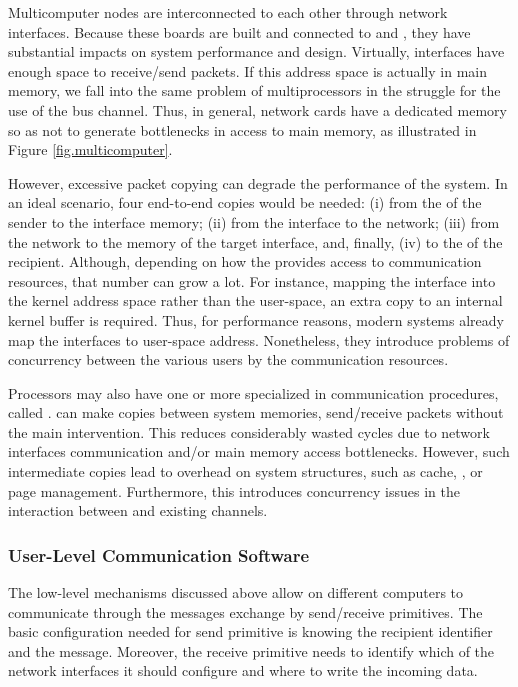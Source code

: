 				Multicomputer nodes are interconnected to each other through network interfaces.
				Because these boards are built and connected to \cpus and \ram,
				they have substantial impacts on system performance and \os design.
				Virtually, interfaces have enough \ram space to receive/send packets.
				If this address space is actually in main memory, we fall into the same
				problem of multiprocessors in the struggle for the use of the bus channel.
				Thus, in general, network cards have a dedicated memory so as not to
				generate bottlenecks in access to main memory, as illustrated in Figure \ref{fig.multicomputer}.

				However, excessive packet copying can degrade the performance of the system.
				In an ideal scenario, four end-to-end copies would be needed:
				(i) from the \ram of the sender to the interface memory; (ii) from the interface
				to the network; (iii) from the network to the memory of the target interface, and,
				finally, (iv) to the \ram of the recipient.
				Although, depending on how the \os provides access to communication
				resources, that number can grow a lot.
				For instance, mapping the interface into the kernel address space
				rather than the user-space, an extra copy to an internal kernel
				buffer is required.
				Thus, for performance reasons, modern systems already map the interfaces
				to user-space address.
				Nonetheless, they introduce problems of concurrency between the various
				users by the communication resources.

				Processors may also have one or more \cpus specialized in
				communication procedures, called \dma.
				\dmas can make copies between system memories, send/receive packets
				without the main \cpus intervention. This reduces considerably wasted cycles due to 
				network interfaces communication and/or main memory access bottlenecks.
				However, such intermediate copies lead to overhead on system structures,
				such as cache, \tlb, or page management.
				Furthermore, this introduces concurrency issues in the interaction between
				\cpus and existing \dma channels.

			\subsubsection{User-Level Communication Software}
			\label{sec.multicomputers-user-sw}

				The low-level mechanisms discussed above allow \cpus on different
				computers to communicate through the messages exchange by
				send/receive primitives.
				The basic configuration needed for send primitive is knowing the
				recipient identifier and the message.
				Moreover, the receive primitive needs to identify which of
				the network interfaces it should configure and where to write the
				incoming data.

